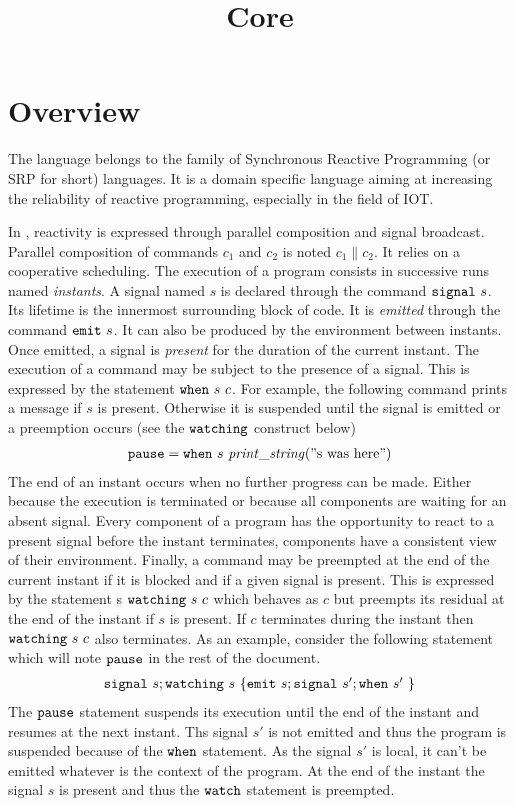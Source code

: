 \documentclass[12pt]{article}
\title{Core \sail}
\def\signal{{\tt{signal}}}
\def\emit{{\tt{emit}}}
\newcommand{\when}[2]{{\tt{when}}~#1~#2}
\newcommand{\watching}[2]{{\tt{watching}}~#1~#2}
\def\sail{{\sc{sail}}}
\begin{document}
\maketitle
\section{Overview}
The \sail{} language belongs to the family of Synchronous Reactive Programming 
(or SRP for short) languages. It is a domain specific language aiming at increasing the
reliability of reactive programming, especially in the field of IOT. 

In \sail{}, reactivity is expressed through parallel composition and signal broadcast. Parallel composition of commands 
$c_1$ and $c_2$ is noted $c_1 \parallel c_2$. It relies on a cooperative scheduling.
The execution of a program consists in successive runs named {\emph{instants}}. 
A signal named $s$ is declared through the command $\signal~s$. Its lifetime is the innermost surrounding block of code.
It is {\emph{emitted}} through the command $\emit~s$. It can also be produced by the environment
between instants. Once emitted, a signal is {\emph{present}} for the duration of the current instant. 
The execution of a command may be subject to the presence of a signal.
This is expressed by the statement $\when{s}{c}$. 
For example, the following command prints a message if $s$ is present. Otherwise it is suspended
until the signal is emitted or a preemption occurs (see the ${\tt{watching}}$ construct below)
$$
\begin{array}{l}
  {\tt{pause}} = \when{s}{{\mathit{print\_string}}("{\text{s was here}}")}
\end{array}
$$
The end of an instant occurs when  no further progress can be made. Either because the execution 
is terminated or because all components are waiting for an absent signal.
Every component of a program has the opportunity to react to a present signal before the instant
terminates, components have a consistent view of their environment. 
Finally, a command may be preempted at the end of the current instant if it is blocked and if a given signal is present. 
This is expressed by the statement s $\watching{s}{c}$ which behaves as $c$ but preempts its residual at the end 
of the instant if $s$ is present. If $c$ terminates during the instant then $\watching{s}{c}$ also terminates.
As an example, consider the following statement which will note ${\tt{pause}}$ in the rest of the document.
$$
\begin{array}{c}
  \signal~s; \watching{s}{\{\emit~s;\signal~s';\when{s'}{}\}}
\end{array}
$$
The ${\tt{pause}}$ statement suspends its execution until the end of the instant and resumes at the next instant.
Ths signal $s'$ is not emitted and thus the program is suspended because of the ${\tt{when}}$ statement. As the signal $s'$ is 
local, it can't be emitted whatever is the context of the program. At the end of 
the instant the signal $s$ is present and thus the ${\tt{watch}}$ statement is preempted.
\end{document}
